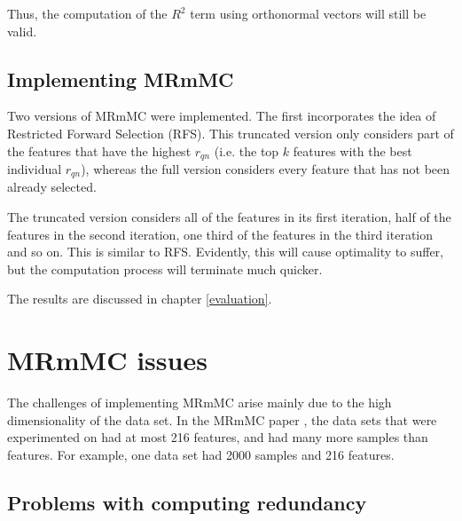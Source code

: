 \documentclass[12pt, twoside, a4paper]{report}
\begin{document}
Thus, the computation of the $R^2$ term using orthonormal vectors will still be valid.

\subsection{Implementing MRmMC}

Two versions of MRmMC were implemented. The first incorporates the idea of Restricted Forward Selection (RFS). This truncated version only considers part of the features that have the highest $r_{qn}$ (i.e. the top $k$ features with the best individual $r_{qn}$), whereas the full version considers every feature that has not been already selected.

The truncated version considers all of the features in its first iteration, half of the features in the second iteration, one third of the features in the third iteration and so on. This is similar to RFS. Evidently, this will cause optimality to suffer, but the computation process will terminate much quicker.

The results are discussed in chapter \ref{evaluation}.

\section{MRmMC issues} \label{mrmmc:issues}

The challenges of implementing MRmMC arise mainly due to the high dimensionality of the data set. In the MRmMC paper \cite{RefWorks:187}, the data sets that were experimented on had at most 216 features, and had many more samples than features. For example, one data set had 2000 samples and 216 features.

\subsection{Problems with computing redundancy} \label{mrmmc_probs}
\end{document}
